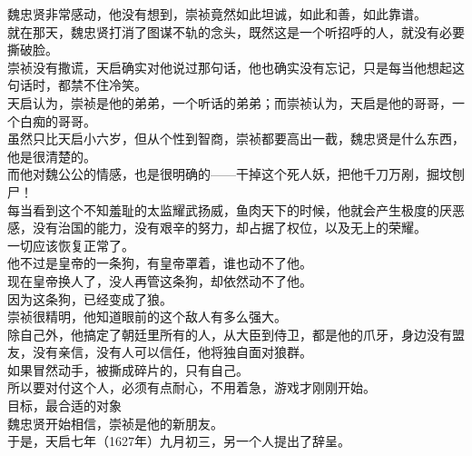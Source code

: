\begin{multicols}{\theparacolNo}
魏忠贤非常感动，他没有想到，崇祯竟然如此坦诚，如此和善，如此靠谱。\\

就在那天，魏忠贤打消了图谋不轨的念头，既然这是一个听招呼的人，就没有必要撕破脸。\\

崇祯没有撒谎，天启确实对他说过那句话，他也确实没有忘记，只是每当他想起这句话时，都禁不住冷笑。\\

天启认为，崇祯是他的弟弟，一个听话的弟弟；而崇祯认为，天启是他的哥哥，一个白痴的哥哥。\\

虽然只比天启小六岁，但从个性到智商，崇祯都要高出一截，魏忠贤是什么东西，他是很清楚的。\\

而他对魏公公的情感，也是很明确的——干掉这个死人妖，把他千刀万剐，掘坟刨尸！\\

每当看到这个不知羞耻的太监耀武扬威，鱼肉天下的时候，他就会产生极度的厌恶感，没有治国的能力，没有艰辛的努力，却占据了权位，以及无上的荣耀。\\

一切应该恢复正常了。\\

他不过是皇帝的一条狗，有皇帝罩着，谁也动不了他。\\

现在皇帝换人了，没人再管这条狗，却依然动不了他。\\

因为这条狗，已经变成了狼。\\

崇祯很精明，他知道眼前的这个敌人有多么强大。\\

除自己外，他搞定了朝廷里所有的人，从大臣到侍卫，都是他的爪牙，身边没有盟友，没有亲信，没有人可以信任，他将独自面对狼群。\\

如果冒然动手，被撕成碎片的，只有自己。\\

所以要对付这个人，必须有点耐心，不用着急，游戏才刚刚开始。\\

目标，最合适的对象\\

魏忠贤开始相信，崇祯是他的新朋友。\\

于是，天启七年（1627年）九月初三，另一个人提出了辞呈。\\


\end{multicols}
